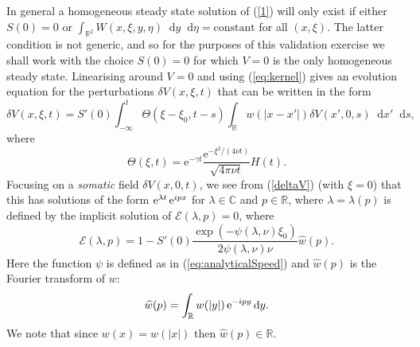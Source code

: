 \documentclass[a4paper,final]{siamart190516}
\newcommand{\Cb}{\mathbb{C}}
\newcommand{\Rb}{\mathbb{R}}
\newcommand{\diff}{\mathop{}\!\mathrm{d}}
\begin{document}
In general a homogeneous steady state solution of (\ref{1}) will only exist if either
$S(0)=0$ or $\int_{\Rb^2} W(x,\xi,y,\eta)\diff y \diff \eta = \text{constant}$
for all $(x,\xi)$.  The latter condition is not generic, and so for the purposes of
this validation exercise we shall work with the choice $S(0)=0$ for which $V=0$ is
the only homogeneous steady state.  Linearising around $V=0$ and using
(\ref{eq:kernel}) gives an evolution equation for the perturbations $\delta
V(x,\xi,t)$ that can be written in the form
\begin{equation}
\delta V(x,\xi,t) = S'(0) \int_{-\infty}^t \Theta(\xi-\xi_0,t-s) \int_{\Rb} 
w(|x-x'|) \delta V(x',0,s) \diff x' \diff s,
\label{deltaV}
\end{equation}
where
\[
  \Theta(\xi, t)=\mathrm{e}^{-\gamma t} \frac{\mathrm{e}^{-\xi^{2} /(4 \nu
  t)}}{\sqrt{4 \pi \nu t}} H(t).
\]
Focusing on a \textit{somatic} field $\delta V(x,0,t)$, we see from (\ref{deltaV})
(with $\xi=0$) that this has solutions of the form $\operatorname{e}^{\lambda t} \operatorname{e}^{i p x}$ for
$\lambda \in \Cb$ and $p \in \Rb$, where $\lambda=\lambda(p)$ is defined by the
implicit solution of $\mathcal{E}(\lambda,p)=0$, where
\begin{equation}
\mathcal{E}(\lambda,p) = 1 - S'(0) \frac{\exp(-\psi(\lambda,\nu) \xi_0 )}{2 \psi(\lambda,\nu) \nu} \widehat{w}(p) .
\end{equation}
Here the function $\psi$ is defined as in (\ref{eq:analyticalSpeed}) and
$\widehat{w}(p)$ is the Fourier transform of $w$:
\begin{equation}
\widehat{w}(p) = \int_{\Rb}  w(|y|) \e^{-i p y} \diff y.
\end{equation}
We note that since $w(x)=w(|x|)$ then $\widehat{w}(p) \in \Rb$.  
\end{document}
